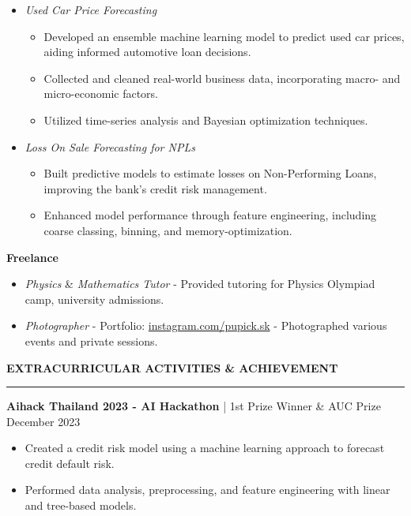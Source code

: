 \documentclass[a4paper,11pt]{article}
\begin{document}
\begin{itemize}[topsep=0pt, parsep=0pt]
    \item \textit{Used Car Price Forecasting}
    {\fontsize{10pt}{11pt}\selectfont
    \begin{itemize}[noitemsep, topsep=0pt, partopsep=0pt, parsep=0pt, leftmargin=*]
        \item Developed an ensemble machine learning model to predict used car prices, aiding informed automotive loan decisions.
        \item Collected and cleaned real-world business data, incorporating macro- and micro-economic factors.
        \item Utilized time-series analysis and Bayesian optimization techniques.
    \end{itemize}
    }
    \item \textit{Loss On Sale Forecasting for NPLs}
    {\fontsize{10pt}{11pt}\selectfont
    \begin{itemize}[noitemsep, topsep=0pt, partopsep=0pt, parsep=0pt, leftmargin=*]
        \item Built predictive models to estimate losses on Non-Performing Loans, improving the bank's credit risk management.
        \item Enhanced model performance through feature engineering, including coarse classing, binning, and memory-optimization.
    \end{itemize}
    }
\end{itemize}

\textbf{Freelance}
\begin{itemize}[noitemsep, topsep=0pt, partopsep=0pt, parsep=0pt]
    \item \textit{Physics} \& \textit{Mathematics Tutor} - Provided tutoring for Physics Olympiad camp, university admissions.
    \item \textit{Photographer} - Portfolio: \href{https://www.instagram.com/pupick.sk/}{instagram.com/pupick.sk} - Photographed various events and private sessions.
\end{itemize}

\vspace{6pt}
\textbf{EXTRACURRICULAR ACTIVITIES \& ACHIEVEMENT}
\vspace{5pt}
{\color{NavyBlue}\hrule}
\vspace{6pt}

\textbf{Aihack Thailand 2023 - AI Hackathon} | 1st Prize Winner \& AUC Prize \hfill December 2023
\begin{itemize}[noitemsep, topsep=0pt, partopsep=0pt, parsep=0pt]
    \item Created a credit risk model using a machine learning approach to forecast credit default risk.
    \item Performed data analysis, preprocessing, and feature engineering with linear and tree-based models.
\end{itemize}
\end{document}
